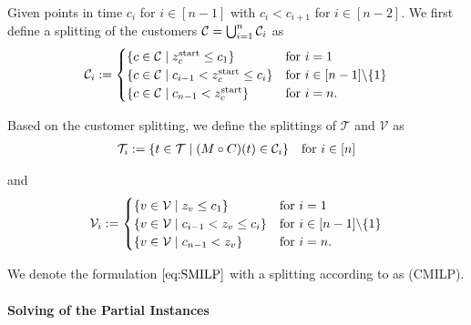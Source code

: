 \begin{definition}
\label{def:customer_dependent_splitting}

Given points in time $c_i$ for $i\in[n-1]$ with $c_i<c_{i+1}$ for $i\in[n-2]$. We first define a splitting of the customers $\mathcal{C}=\bigcup_{i=1}^n\mathcal{C}_i$ as
\begin{align*}
	\mathcal{C}_i := \begin{cases}
		\left\{c\in\mathcal{C}\mid z^{\operatorname{start}}_c\leq c_1\right\} & \text{for } i=1 \\
		\left\{c\in\mathcal{C}\mid c_{i-1}<z^{\operatorname{start}}_c\leq c_i\right\} & \text{for } i\in[n-1]\backslash\{1\} \\
		\left\{c\in\mathcal{C}\mid c_{n-1}<z^{\operatorname{start}}_c\right\} & \text{for } i=n.
	\end{cases}
\end{align*}

Based on the customer splitting, we define the splittings of $\mathcal{T}$ and $\mathcal{V}$ as
\begin{align*}
	\mathcal{T}_i := \left\{t\in\mathcal{T}\mid (M\circ C)(t)\in\mathcal{C}_i\right\} && \text{for } i\in[n]
\end{align*}

and
\begin{align*}
	\mathcal{V}_i := \begin{cases}
		\left\{v\in\mathcal{V}\mid z_v\leq c_1\right\} & \text{for } i=1 \\
		\left\{v\in\mathcal{V}\mid c_{i-1}<z_v\leq c_i\right\} & \text{for } i\in[n-1]\backslash\{1\} \\
		\left\{v\in\mathcal{V}\mid c_{n-1}<z_v\right\} & \text{for } i=n.
	\end{cases}
\end{align*}

\end{definition}

We denote the formulation $\eqref{eq:SMILP}$ with a splitting according to  as (CMILP).

\paragraph{Solving of the Partial Instances} \parfill


